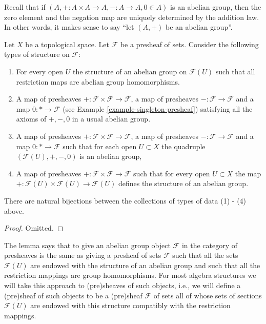 \noindent
Recall that if $(A, + : A \times A \to A, - : A \to A, 0\in A)$
is an abelian group, then the zero element and the negation map are
uniquely determined by the addition law. In other words, it
makes sense to say ``let $(A, +)$ be an abelian group''.

\begin{lemma}
\label{lemma-abelian-presheaves}
Let $X$ be a topological space.
Let $\mathcal{F}$ be a presheaf of sets.
Consider the following types of structure on $\mathcal{F}$:
\begin{enumerate}
\item For every open $U$ the structure of an abelian group
on $\mathcal{F}(U)$ such that all restriction maps are
abelian group homomorphisms.
\item A map of presheaves
$+ : \mathcal{F} \times \mathcal{F} \to \mathcal{F}$,
a map of presheaves $- : \mathcal{F} \to \mathcal{F}$
and a map $0 : * \to \mathcal{F}$
(see Example \ref{example-singleton-presheaf})
satisfying all the axioms of $+, -, 0$ in a usual
abelian group.
\item A map of presheaves
$+ : \mathcal{F} \times \mathcal{F} \to \mathcal{F}$,
a map of presheaves $- : \mathcal{F} \to \mathcal{F}$
and a map $0 : * \to \mathcal{F}$
such that for each open $U \subset X$ the quadruple
$(\mathcal{F}(U), +, -, 0)$ is an abelian group,
\item A map of presheaves $+ : \mathcal{F} \times \mathcal{F}
\to \mathcal{F}$ such that for every open $U \subset X$
the map $+ : \mathcal{F}(U) \times \mathcal{F}(U) \to \mathcal{F}(U)$
defines the structure of an abelian group.
\end{enumerate}
There are natural bijections between the collections of
types of data (1) - (4) above.
\end{lemma}

\begin{proof}
Omitted.
\end{proof}

\noindent
The lemma says that to give an abelian group object $\mathcal{F}$
in the category of presheaves is the same as giving a presheaf of sets
$\mathcal{F}$ such that all the sets $\mathcal{F}(U)$ are endowed
with the structure of an abelian group and such that all the restriction
mappings are group homomorphisms. For most algebra structures
we will take this approach to (pre)sheaves of such objects, i.e.,
we will define a (pre)sheaf of such objects to be a (pre)sheaf
$\mathcal{F}$ of sets all of whose sets of sections $\mathcal{F}(U)$
are endowed with this structure compatibly with the restriction
mappings.

